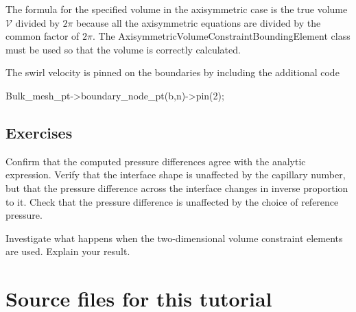 \begin{DoxyItemize}
\item The formula for the specified volume in the axisymmetric case is the true volume $ \mathcal{V} $ divided by $ 2\pi $ because all the axisymmetric equations are divided by the common factor of $ 2 \pi $. The {\ttfamily Axisymmetric\+Volume\+Constraint\+Bounding\+Element} class must be used so that the volume is correctly calculated.
\item The swirl velocity is pinned on the boundaries by including the additional code 
\begin{DoxyCode}
Bulk\_mesh\_pt->boundary\_node\_pt(b,n)->pin(2);
\end{DoxyCode}

\end{DoxyItemize}\hypertarget{index_exercises}{}\subsection{Exercises}\label{index_exercises}

\begin{DoxyEnumerate}
\item Confirm that the computed pressure differences agree with the analytic expression. Verify that the interface shape is unaffected by the capillary number, but that the pressure difference across the interface changes in inverse proportion to it. Check that the pressure difference is unaffected by the choice of reference pressure.~\newline
~\newline

\item Investigate what happens when the two-\/dimensional volume constraint elements are used. Explain your result. ~\newline
~\newline

\end{DoxyEnumerate}

 

\hypertarget{index_sources}{}\section{Source files for this tutorial}\label{index_sources}

